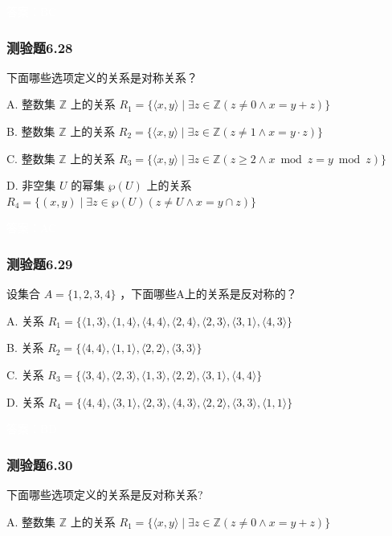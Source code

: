 \documentclass[UTF8, heading=true]{ctexart}
\begin{document}
\textcolor{white}{答案：BC}

\subsubsection{测验题6.28}

下面哪些选项定义的关系是对称关系？

A. 整数集 $\mathbb{Z}$ 上的关系 $R_1=\{\langle x, y\rangle \mid \exists z \in \mathbb{Z}(z \neq 0 \wedge x=y+z)\}$

B. 整数集 $\mathbb{Z}$ 上的关系 $R_2=\{\langle x, y\rangle \mid \exists z \in \mathbb{Z}(z \neq 1 \wedge x=y \cdot z)\}$

C. 整数集 $\mathbb{Z}$ 上的关系 $R_3=\{\langle x, y\rangle \mid \exists z \in \mathbb{Z}(z \geq 2 \wedge x \bmod z=y \bmod z)\}$

D. 非空集 $U$ 的幂集 $\wp(U)$ 上的关系 $R_4=\{(x, y) \mid \exists z \in \wp(U)(z \neq U \wedge x=y \cap z)\}$

\textcolor{white}{答案：AC}

\subsubsection{测验题6.29}


设集合 $A=\{1,2,3,4\}$ ，下面哪些A上的关系是反对称的？

A. 关系 $R_1 = \{\langle 1,3\rangle, \langle 1,4\rangle, \langle 4,4\rangle, \langle 2,4\rangle, \langle 2,3\rangle, \langle 3,1\rangle, \langle 4,3\rangle\}$

B. 关系 $R_2 = \{\langle 4,4\rangle, \langle 1,1\rangle, \langle 2,2\rangle, \langle 3,3\rangle\}$

C. 关系 $R_3 = \{\langle 3,4\rangle, \langle 2,3\rangle, \langle 1,3\rangle, \langle 2,2\rangle, \langle 3,1\rangle, \langle 4,4\rangle\}$

D. 关系 $R_4 = \{\langle 4,4\rangle, \langle 3,1\rangle, \langle 2,3\rangle, \langle 4,3\rangle, \langle 2,2\rangle, \langle 3,3\rangle, \langle 1,1\rangle\}$


\textcolor{white}{答案：BD}

\subsubsection{测验题6.30}

下面哪些选项定义的关系是反对称关系?

A. 整数集 $\mathbb{Z}$ 上的关系 $R_1=\{\langle x, y\rangle \mid \exists z \in \mathbb{Z}(z \neq 0 \wedge x=y+z)\}$
\end{document}
